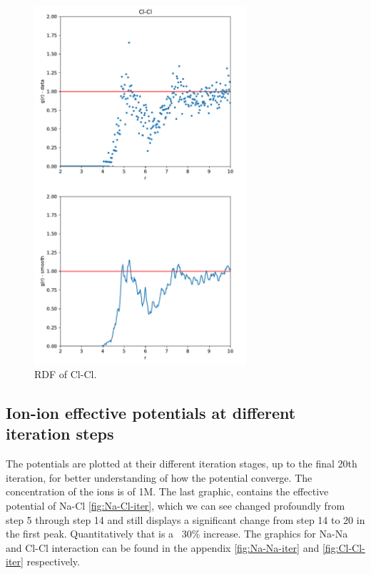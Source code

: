 \documentclass[10pt]{article}
\begin{document}
    \begin{figure}[H]
            \centering
            \includegraphics[width = 0.7\textwidth]{RDF-ClCl.png}
            \caption{RDF of Cl-Cl.}
            \label{fig:rdf_Cl-Cl}
    \end{figure}
    
    \subsection{Ion-ion effective potentials at different iteration steps}
        \label{r:pot}

        The potentials are plotted at their different iteration stages, up to the final 20th iteration, for better understanding of how the potential converge. The concentration of the ions is of 1M. The last graphic, contains the effective potential of Na-Cl \ref{fig:Na-Cl-iter}, which we can see changed profoundly from step 5 through step 14 and still displays a significant change from step 14 to 20 in the first peak. Quantitatively that is a ~30\% increase. The graphics for Na-Na and Cl-Cl interaction can be found in the appendix \ref{fig:Na-Na-iter} and \ref{fig:Cl-Cl-iter} respectively.
        
\end{document}
